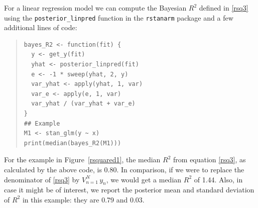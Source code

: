 \documentclass[11pt]{article}
\begin{document}
For a linear regression model we can compute the Bayesian $R^2$ defined in
\eqref{rsq3} using the \verb#posterior_linpred# function in the {\tt rstanarm}
package and a few additional lines of code:
%
\vspace{-\baselineskip}
\begin{quotation}
\noindent
\begin{small}
\begin{verbatim}
bayes_R2 <- function(fit) {
  y <- get_y(fit)
  yhat <- posterior_linpred(fit)
  e <- -1 * sweep(yhat, 2, y)
  var_yhat <- apply(yhat, 1, var)
  var_e <- apply(e, 1, var)
  var_yhat / (var_yhat + var_e)
}
## Example
M1 <- stan_glm(y ~ x)
print(median(bayes_R2(M1)))
\end{verbatim}
\end{small}
\end{quotation}
%
For the example in Figure~\ref{rsquared1}, the median $R^2$ from
equation \eqref{rsq3}, as calculated by the above code, is 0.80.  In comparison,
if we were to replace the denominator of \eqref{rsq3} by $V_{n=1}^N \,y_n$, we
would get a median $R^2$ of 1.44.  Also, in case it might be of interest, we
report the posterior mean and standard deviation of $R^2$ in this example:
they are 0.79 and 0.03.
\end{document}
